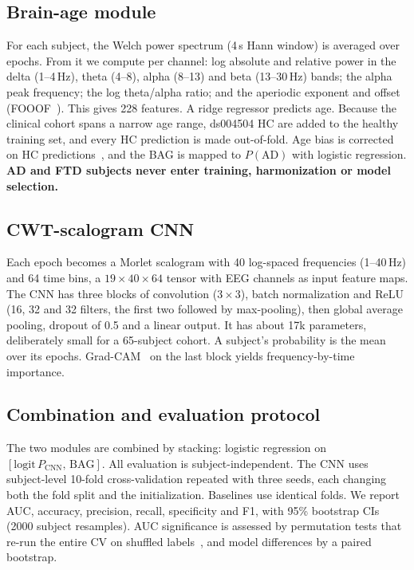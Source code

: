 \documentclass[conference]{IEEEtran}
\begin{document}
\subsection{Brain-age module}
For each subject, the Welch power spectrum (4\,s Hann window) is averaged over epochs. From it we compute per channel: log absolute and relative power in the delta (1--4\,Hz), theta (4--8), alpha (8--13) and beta (13--30\,Hz) bands; the alpha peak frequency; the log theta/alpha ratio; and the aperiodic exponent and offset (FOOOF~\cite{fooof}). This gives 228 features. A ridge regressor predicts age. Because the clinical cohort spans a narrow age range, ds004504 HC are added to the healthy training set, and every HC prediction is made out-of-fold. Age bias is corrected on HC predictions~\cite{delange2020}, and the BAG is mapped to $P(\mathrm{AD})$ with logistic regression. \textbf{AD and FTD subjects never enter training, harmonization or model selection.}

\subsection{CWT-scalogram CNN}
Each epoch becomes a Morlet scalogram with 40 log-spaced frequencies (1--40\,Hz) and 64 time bins, a $19\times40\times64$ tensor with EEG channels as input feature maps. The CNN has three blocks of convolution ($3\times3$), batch normalization and ReLU (16, 32 and 32 filters, the first two followed by max-pooling), then global average pooling, dropout of 0.5 and a linear output. It has about 17k parameters, deliberately small for a 65-subject cohort. A subject's probability is the mean over its epochs. Grad-CAM~\cite{gradcam} on the last block yields frequency-by-time importance.

\subsection{Combination and evaluation protocol}
The two modules are combined by stacking: logistic regression on $[\mathrm{logit}\,P_\mathrm{CNN},\,\mathrm{BAG}]$. All evaluation is subject-independent. The CNN uses subject-level 10-fold cross-validation repeated with three seeds, each changing both the fold split and the initialization. Baselines use identical folds. We report AUC, accuracy, precision, recall, specificity and F1, with 95\% bootstrap CIs (2000 subject resamples). AUC significance is assessed by permutation tests that re-run the entire CV on shuffled labels~\cite{ojala2010}, and model differences by a paired bootstrap.
\end{document}
